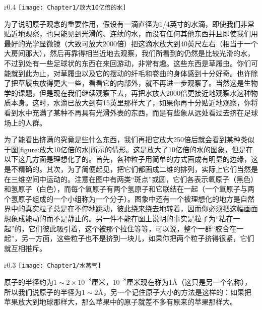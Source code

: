 \begin{wrapfigure}{r}{0.4\textwidth}
    \centering
    \texttt{[image: Chapter1/放大10亿倍的水]}
    \caption{放大10亿倍的水}
    \label{figure:放大10亿倍的水}
\end{wrapfigure}
为了说明原子观念的重要作用，假设有一滴直径为1/4英寸的水滴，即使我们非常贴近地观察，也只能见到光滑的、连续的水，而没有任何其他东西并且即使我们用最好的光学显微镜（大致可放大2000倍）把这滴水放大到40英尺左右（相当于一个大房间那大），然后再靠得相当近地去观察，我们所看到的仍然是比较光滑的水，不过到处有一些足球状的东西在来回游动，非常有趣。这些东西是草履虫。你们可能就到此为止，对草履虫以及它的摆动的纤毛和卷曲的身体感到十分好奇。也许除了把草履虫放得更大一些，看看它的内部外，就不再进一步观察了。当然这是生物学的课题，但是现在我们继续观察下去，再把水放大2000倍更接近地观察水这种物质本身。这时，水滴已放大到有15英里那样大了，如果你再十分贴近地观察，你将看到水中充满了某种不再具有光滑外表的东西，而是有些象从远处看过去挤在足球场上的人群。

为了能看出挤满的究竟是些什么东西，我们再把它放大250倍后就会看到某种类似于图\ref{figure:放大10亿倍的水}所示的情形。这是放大了10亿倍的水的图象，但是在以下这几方面是理想化了的。首先，各种粒子用简单的方式画成有明显的边缘，这是不精确的。其次，为了简便起见，把它们都画成二维的排列，实际上它们当然是在三维空间中运动的。注意在图中有两类“斑点”或圆，它们各表示氧原子（黑色）和氢原子（白色），而每个氧原子有两个氢原子和它联结在一起（一个氧原子与两个氢原子组成的一个小组称为一个分子）。图象中还有一个被理想化的地方是自然界中的真实粒子总是在不停地跳动，彼此绕来绕去地转着，因而你必须把这幅画面想象成能动的而不是静止的。另一件不能在图上说明的事实是粒子为“粘在一起”的，它们彼此吸引着，这个被那个拉住等等，可以说，整个一群“胶合在一起”，另一方面，这些粒子也不是挤到一块儿，如果你把两个粒子挤得很紧，它们就互相推斥。

\begin{wrapfigure}{r}{0.3\textwidth}
    \centering
    \texttt{[image: Chapter1/水蒸气]}
    \caption{水蒸气}
    \label{figure:水蒸气}
\end{wrapfigure}
原子的半径约为$1\sim2\times10^{-8}$厘米，$ 10^{-8} $厘米现在称为1Å（这只是另一个名称），所以我们说原子的半径为$1\sim2$\r{A}，另一个记住原子大小的方法是这样的：如果把苹果放大到地球那样大，那么苹果中的原子就差不多有原来的苹果那样大。

